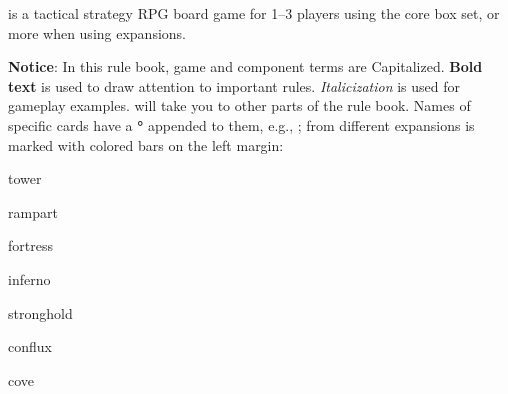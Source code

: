 

\begin{multicols*}{2}
 is a tactical strategy RPG board game for 1--3 players using the core box set, or more when using expansions.  %

\textbf{Notice}: In this rule book, game and component terms are Capitalized.
\textbf{Bold text} is used to draw attention to important rules.
\textit{Italicization} is used for gameplay examples.
 will take you to other parts of the rule book.
Names of specific cards have a \textcolor{goldenbrown}{\textbf{°}} appended to them, e.g., ;
\iftoggle{printable}{%
  you can find further information about them in the \pagelink{wiki}{Game Wiki}.
}{%
  clicking them will take you to a Wiki page about the specific card.\\
}
 from different expansions is marked with colored bars on the left margin:

\begin{expansion}{tower}
  \phantom{Tower content.}
\end{expansion}

\begin{expansion}{rampart}
  \phantom{Rampart content.}
\end{expansion}

\begin{expansion}{fortress}
  \phantom{Fortress content.}
\end{expansion}

\begin{expansion}{inferno}
  \phantom{Inferno content.}
\end{expansion}

\begin{expansion}{stronghold}
  \phantom{Stronghold content.}
\end{expansion}

\begin{expansion}{conflux}
  \phantom{Conflux content.}
\end{expansion}

\begin{expansion}{cove}
  \phantom{Cove content.}
\end{expansion}


\end{multicols*}
